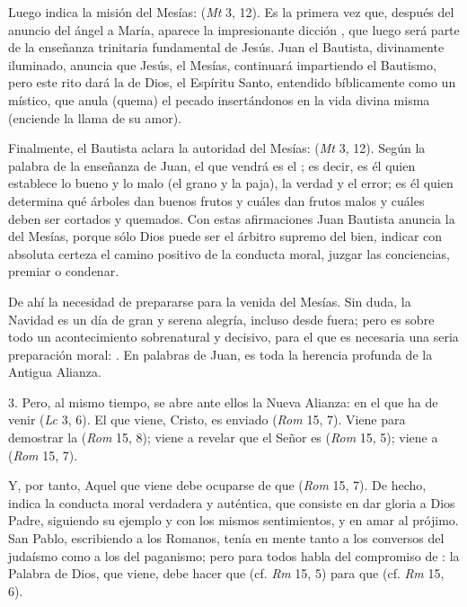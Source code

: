 \begin{body}
	Luego indica la misión del Mesías:  (\emph{Mt} 3, 12). Es la primera vez que, después del anuncio del ángel a María, aparece la impresionante dicción , que luego será parte de la enseñanza trinitaria fundamental de Jesús. Juan el Bautista, divinamente iluminado, anuncia que Jesús, el Mesías, continuará impartiendo el Bautismo, pero este rito dará la  de Dios, el Espíritu Santo, entendido bíblicamente como un  místico, que anula (quema) el pecado insertándonos en la vida divina misma (enciende la llama de su amor). 
	
	Finalmente, el Bautista aclara la autoridad del Mesías:  (\emph{Mt} 3, 12). Según la palabra de la enseñanza de Juan, el que vendrá es el ; es decir, es él quien establece lo bueno y lo malo (el grano y la paja), la verdad y el error; es él quien determina qué árboles dan buenos frutos y cuáles dan frutos malos y cuáles deben ser cortados y quemados. Con estas afirmaciones Juan Bautista anuncia la  del Mesías, porque sólo Dios puede ser el árbitro supremo del bien, indicar con absoluta certeza el camino positivo de la conducta moral, juzgar las conciencias, premiar o condenar. 
	
	De ahí la necesidad de prepararse para la venida del Mesías. Sin duda, la Navidad es un día de gran y serena alegría, incluso desde fuera; pero es sobre todo un acontecimiento sobrenatural y decisivo, para el que es necesaria una seria preparación moral: . En palabras de Juan, es toda la herencia profunda de la Antigua Alianza. 
	
	3. Pero, al mismo tiempo, se abre ante ellos la Nueva Alianza: en el que ha de venir  (\emph{Lc} 3, 6). El que viene, Cristo, es enviado  (\emph{Rom} 15, 7). Viene para demostrar la  (\emph{Rom} 15, 8); viene a revelar que el Señor es  (\emph{Rom} 15, 5); viene a  (\emph{Rom} 15, 7). 
	
	Y, por tanto, Aquel que viene debe ocuparse de que  (\emph{Rom} 15, 7). De hecho, indica la conducta moral verdadera y auténtica, que consiste en dar gloria a Dios Padre, siguiendo su ejemplo y con los mismos sentimientos, y en amar al prójimo. San Pablo, escribiendo a los Romanos, tenía en mente tanto a los conversos del judaísmo como a los del paganismo; pero para todos habla del compromiso de : la Palabra de Dios, que viene, debe hacer que  (cf. \emph{Rm} 15, 5) para que  (cf. \emph{Rm} 15, 6). 
	

\end{body}
